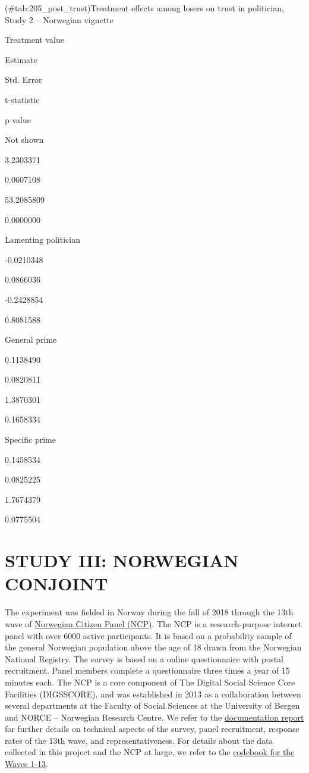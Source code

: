 \documentclass[]{book}
\begin{document}
(\#tab:205\_post\_trust)Treatment effects among losers on trust in
politician, Study 2 -- Norwegian vignette

Treatment value

Estimate

Std. Error

t-statistic

p value

Not shown

3.2303371

0.0607108

53.2085809

0.0000000

Lamenting politician

-0.0210348

0.0866036

-0.2428854

0.8081588

General prime

0.1138490

0.0820811

1.3870301

0.1658334

Specific prime

0.1458534

0.0825225

1.7674379

0.0775504

\part{STUDY III: NORWEGIAN
CONJOINT}\label{part-study-iii-norwegian-conjoint}

The experiment was fielded in Norway during the fall of 2018 through the
13th wave of \href{https://www.uib.no/medborger}{Norwegian Citizen Panel
(NCP)}. The NCP is a research-purpose internet panel with over 6000
active participants. It is based on a probability sample of the general
Norwegian population above the age of 18 drawn from the Norwegian
National Registry. The survey is based on a online questionnaire with
postal recruitment. Panel members complete a questionnaire three times a
year of 15 minutes each. The NCP is a core component of The Digital
Social Science Core Facilities (DIGSSCORE), and was established in 2013
as a collaboration between several departments at the Faculty of Social
Sciences at the University of Bergen and NORCE -- Norwegian Research
Centre. We refer to the
\href{Data/ncp-wave13-documentation.pdf}{documentation report} for
further details on technical aspects of the survey, panel recruitment,
response rates of the 13th wave, and representativeness. For details
about the data collected in this project and the NCP at large, we refer
to the \href{Data/ncp-wave13-codebook.pdf}{codebook for the Waves 1-13}.
\end{document}
